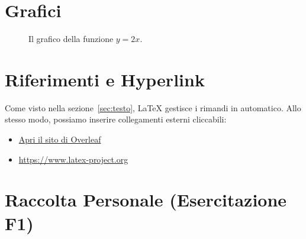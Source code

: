 \documentclass[a4paper,11pt]{article}
\begin{document}


\section{Grafici}
\begin{figure}[htbp]
\centering
{}
\caption{Il grafico della funzione $y=2x$.}
\label{fig:grafico}
\end{figure}



\section{Riferimenti e Hyperlink}
Come visto nella sezione~\ref{sec:testo}, LaTeX gestisce i rimandi in automatico. 
Allo stesso modo, possiamo inserire collegamenti esterni cliccabili:
\begin{itemize}
  \item \href{https://www.overleaf.com}{Apri il sito di Overleaf}
  \item \url{https://www.latex-project.org}
\end{itemize}


\clearpage
\section{Raccolta Personale (Esercitazione F1)}
\end{document}
